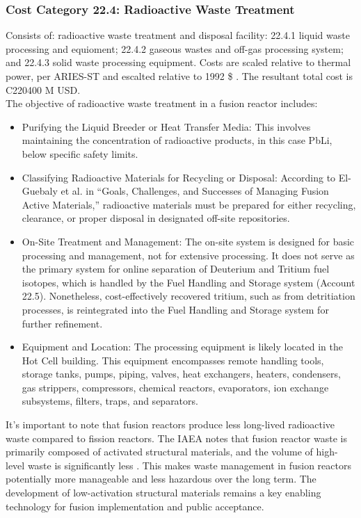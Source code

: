
\subsubsection{Cost Category 22.4: Radioactive Waste Treatment} 
Consists of: radioactive waste treatment and disposal facility: 22.4.1 liquid waste processing and equioment; 22.4.2 gaseous wastes and off-gas processing system; and 22.4.3 solid waste processing equipment. Costs are scaled relative to thermal power, per ARIES-ST and escalted relative to 1992 \$ \cite{DEL90b}. The resultant total cost is C220400 M USD. \\

The objective of radioactive waste treatment in a fusion reactor includes:
\begin{itemize}
\item Purifying the Liquid Breeder or Heat Transfer Media: This involves maintaining the concentration of radioactive products, in this case PbLi, below specific safety limits.

\item Classifying Radioactive Materials for Recycling or Disposal: According to El-Guebaly et al. in “Goals, Challenges, and Successes of Managing Fusion Active Materials,” radioactive materials must be prepared for either recycling, clearance, or proper disposal in designated off-site repositories.

\item On-Site Treatment and Management: The on-site system is designed for basic processing and management, not for extensive processing. It does not serve as the primary system for online separation of Deuterium and Tritium fuel isotopes, which is handled by the Fuel Handling and Storage system (Account 22.5). Nonetheless, cost-effectively recovered tritium, such as from detritiation processes, is reintegrated into the Fuel Handling and Storage system for further refinement.

\item Equipment and Location: The processing equipment is likely located in the Hot Cell building. This equipment encompasses remote handling tools, storage tanks, pumps, piping, valves, heat exchangers, heaters, condensers, gas strippers, compressors, chemical reactors, evaporators, ion exchange subsystems, filters, traps, and separators.

\end{itemize}

It's important to note that fusion reactors produce less long-lived radioactive waste compared to fission reactors. The IAEA notes that fusion reactor waste is primarily composed of activated structural materials, and the volume of high-level waste is significantly less \cite{girard2008summary}. This makes waste management in fusion reactors potentially more manageable and less hazardous over the long term. The development of low-activation structural materials remains a key enabling technology for fusion implementation and public acceptance.




